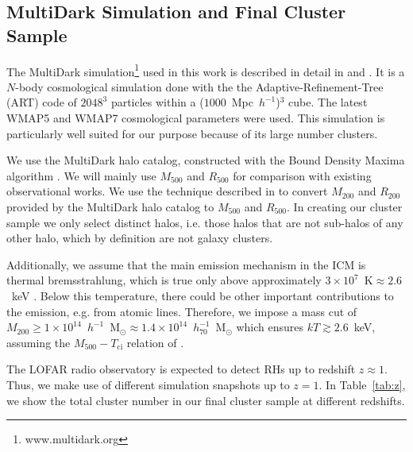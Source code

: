 \documentclass[traditabstract]{aa}
\newcommand{\rmn}{\mathrm}
\begin{document}
\subsection{MultiDark Simulation and Final Cluster Sample}
\label{sec:2.1}
The MultiDark simulation\footnote{www.multidark.org} used in this work is
described in detail in \cite{2011arXiv1104.5130P} and
\cite{2011arXiv1109.0003R}.  It is a $N$-body cosmological simulation done with
the the Adaptive-Refinement-Tree (ART) code \citep{1997ApJS..111...73K} of
$2048^3$ particles within a ($1000$~Mpc~$h^{-1}$)$^3$ cube. The latest WMAP5 and
WMAP7 cosmological parameters were used. This simulation is particularly well
suited for our purpose because of its large number clusters.
 
We use the MultiDark halo catalog, constructed with the Bound Density Maxima
algorithm \citep{1997astro.ph.12217K}.  We will mainly use $M_{500}$ and
$R_{500}$ for comparison with existing observational works.  We use the
technique described in \cite{2003ApJ...584..702H} to convert $M_{200}$ and
$R_{200}$ provided by the MultiDark halo catalog to $M_{500}$ and $R_{500}$.  In
creating our cluster sample we only select distinct halos, i.e. those halos that
are not sub-halos of any other halo, which by definition are not galaxy clusters.

Additionally, we assume that the main emission mechanism in the ICM is thermal
bremsstrahlung, which is true only above approximately
$3\times10^{7}$~$\rmn{K}\approx2.6$~keV \citep{1988xrec.book.....S}. Below this
temperature, there could be other important contributions to the emission,
e.g. from atomic lines. Therefore, we impose a mass cut of
$M_{200}\geq1\times10^{14}$~$h^{-1}$~M$_{\odot}\approx1.4\times10^{14}$~$h_{70}^{-1}$~M$_{\odot}$
which ensures $kT \gtrsim 2.6$~keV, assuming the $M_{500} - T_{\rmn{ci}}$ relation
of \cite{2010MNRAS.406.1773M}.

The LOFAR radio observatory is expected to detect RHs up to redshift $z \approx
1$. Thus, we make use of different simulation snapshots up to $z=1$. In
Table~\ref{tab:z}, we show the total cluster number in our final cluster sample
at different redshifts.
\end{document}
